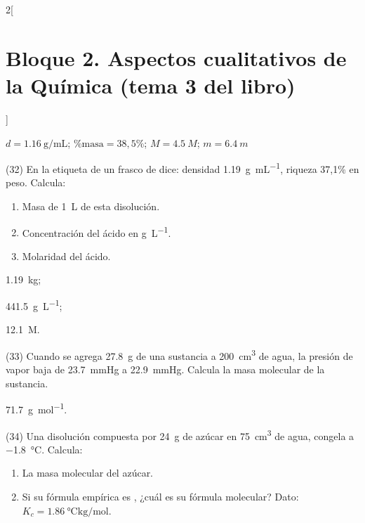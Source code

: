 \documentclass[10pt]{article}
\begin{document}
\begin{multicols}{2}[
    \section{Bloque 2. Aspectos cualitativos de la Química (tema 3 del libro)}
  ]
\begin{solution}
  \( d = \SI{1.16}{\gram\per\milli\liter} \); \( \%\textrm{masa} = 38,5\% \); \( M = \SI{4.5}{M} \); \( m = \SI{6.4}{m} \)
\end{solution}




\begin{exercise}[
    tags    = {},
    topics  = {química,química básica},
    source  = {FQ 1B MGH 2016, p85, e32},
  ]
  (32) En la etiqueta de un frasco de  dice: densidad \SI{1.19}{\gram\per\milli\liter}, riqueza 37,1\% en peso. Calcula:
  \begin{enumerate}
    \item Masa de \SI{1}{\liter} de esta disolución.
    \item Concentración del ácido en \si{\gram\per\liter}.
    \item Molaridad del ácido.
  \end{enumerate}
\end{exercise}

\begin{solution}
  \begin{enumerate*}
    \item \SI{1,19}{\kilo\gram};
    \item \SI{441,5}{\gram\per\liter};
    \item \SI{12,1}{M}.
  \end{enumerate*}
\end{solution}




\begin{exercise}[
    tags    = {},
    topics  = {química,química básica},
    source  = {FQ 1B MGH 2016, p85, e33},
  ]
  (33) Cuando se agrega \SI{27.8}{\gram} de una sustancia a \SI{200}{\cubic\centi\meter} de agua, la presión de vapor baja de \SI{23.7}{\mmHg} a \SI{22.9}{\mmHg}. Calcula la masa molecular de la sustancia.
\end{exercise}

\begin{solution}
  \SI{71.7}{\gram\per\mole}.
\end{solution}




\begin{exercise}[
    tags    = {},
    topics  = {química,química básica},
    source  = {FQ 1B MGH 2016, p85, e34},
  ]
  (34) Una disolución compuesta por \SI{24}{\gram} de azúcar en \SI{75}{\cubic\centi\meter} de agua, congela a \SI{-1.8}{\celsius}. Calcula:
  \begin{enumerate}
    \item La masa molecular del azúcar.
    \item Si su fórmula empírica es , ¿cuál es su fórmula molecular? Dato: \( K_c = \SI{1.86}{\celsius\kilo\gram\per\mole} \).
  \end{enumerate}
\end{exercise}


\end{multicols}
\end{document}

